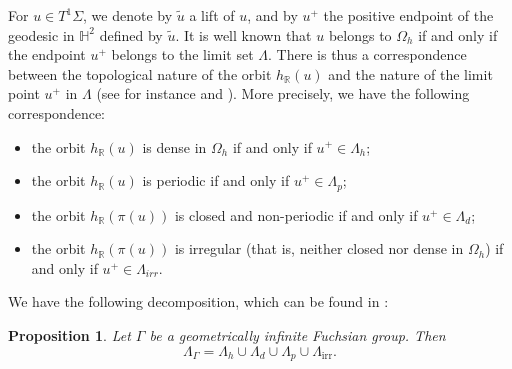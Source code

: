 \documentclass[11pt]{amsart}
\newtheorem{prp}{Proposition}
\begin{document}
For $u \in T^1\Sigma$, we denote by $\widetilde{u}$ a lift of $u$, and by $u^{+}$ the positive endpoint of the geodesic in $\mathbb{H}^2$ defined by $\widetilde{u}$. 
It is well known that $u$ belongs to $\Omega_h$ if and only if the endpoint $u^{+}$ belongs to the limit set $\Lambda$. 
There is thus a correspondence between the topological nature of the orbit $h_{\mathbb{R}}(u)$ and the nature of the limit point $u^{+}$ in $\Lambda$ (see for instance \textbf{\cite{Starkov1995}} and \textbf{\cite{DalboStarkov2000}}). 
More precisely, we have the following correspondence:

{\it 
\begin{itemize}
  \item the orbit $h_{\mathbb{R}}(u)$ is dense in $\Omega_h$ if and only if $u^{+} \in \Lambda_h$;
  \item the orbit $h_{\mathbb{R}}(u)$ is periodic if and only if $u^{+} \in \Lambda_p$;
  \item the orbit $h_{\mathbb{R}}(\pi(u))$ is closed and non-periodic if and only if $u^{+} \in \Lambda_d$;
  \item the orbit $h_{\mathbb{R}}(\pi(u))$ is irregular (that is, neither closed nor dense in $\Omega_h$) if and only if $u^{+} \in \Lambda_{irr}$.
\end{itemize}
}


















We have the following decomposition, which can be found in \cite{DalboStarkov2000}:

\begin{prp}
Let \( \Gamma \) be a geometrically infinite Fuchsian group.  
Then
\[
\Lambda_{\Gamma} = \Lambda_h \cup \Lambda_d \cup \Lambda_p \cup \Lambda_{\mathrm{irr}}.
\]
\end{prp}
\end{document}
